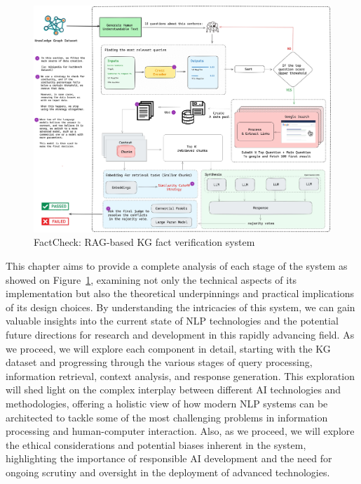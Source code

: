 \begin{figure}[ht!]
    \centering
    \begin{minipage}[b]{\textwidth}
        \centering
        \includegraphics[width=\textwidth]{res/system}
        \caption{FactCheck: RAG-based KG fact verification system}
        \label{fig:system}
    \end{minipage}
\end{figure}

This chapter aims to provide a complete analysis of each stage of the system as showed on Figure~\ref{fig:system}, examining not only the technical aspects of its implementation but also the theoretical underpinnings and practical implications of its design choices.
By understanding the intricacies of this system, we can gain valuable insights into the current state of NLP technologies and the potential future directions for research and development in this rapidly advancing field.
As we proceed, we will explore each component in detail, starting with the \ac{KG} dataset and progressing through the various stages of query processing, information retrieval, context analysis, and response generation.
This exploration will shed light on the complex interplay between different AI technologies and methodologies, offering a holistic view of how modern NLP systems can be architected to tackle some of the most challenging problems in information processing and human-computer interaction.
Also, as we proceed, we will explore the ethical considerations and potential biases inherent in the system, highlighting the importance of responsible AI development and the need for ongoing scrutiny and oversight in the deployment of advanced technologies.

